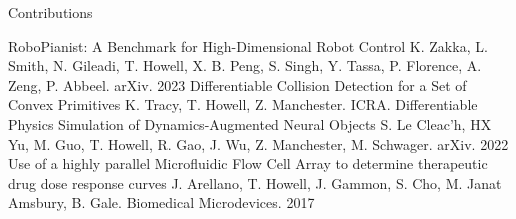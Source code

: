 \begin{center} \small{Contributions} \end{center}
\begin{cvhonors}

\cvhonor 
    {RoboPianist: A Benchmark for High-Dimensional Robot Control}
    {K. Zakka, L. Smith, N. Gileadi, T. Howell, X. B. Peng, S. Singh, Y. Tassa, P. Florence, A. Zeng, P. Abbeel. arXiv.}
    {}
    {2023}
\cvhonor 
    {Differentiable Collision Detection for a Set of Convex Primitives}
    {K. Tracy, T. Howell, Z. Manchester. ICRA.}
    {}
    {}
\cvhonor
    {Differentiable Physics Simulation of Dynamics-Augmented Neural Objects}
    {S. Le Cleac'h, HX Yu, M. Guo, T. Howell, R. Gao, J. Wu, Z. Manchester, M. Schwager. arXiv.}
    {}
    {2022}
\cvhonor
    {Use of a highly parallel Microfluidic Flow Cell Array to determine therapeutic drug dose response curves}
    {J. Arellano, T. Howell, J. Gammon, S. Cho, M. Janat Amsbury, B. Gale. Biomedical Microdevices.}
    {}
    {2017}
    
\end{cvhonors}
